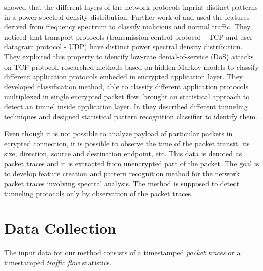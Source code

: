  \cite{he2004spectral} showed that the different layers of the network
protocols inprint distinct patterns in a power spectral density distribution. 
Further work of  and  \cite{chen2007spectral}
used the features derived %
from frequency spectrum to classify malicious and normal traffic.
They noticed that transport protocols (transmission control protocol --
TCP and user datagram protocol - UDP) 
have distinct power spectral density distribution. 
They exploited this property to identify low-rate denial-of-service (DoS)
attacks on TCP protocol. %
 \cite{wright2006inferring} researched methods based on 
hidden Markov models to classify different application protocols embeded in 
encrypted application layer.
They developed classification method, able to classify different 
application protocols multiplexed in single encrypted packet flow.
 brought an statistical approach 
to detect an tunnel inside application layer.
In  \cite{dusi2009tunnel}  they described different tunneling techniques and designed 
statistical pattern recognition classifier to identify them.

Even though it is not possible to analyze payload of particular packets in 
ecrypted connection, it is possible to observe the time of the packet transit, 
its size, direction, source and destination endpoint, etc. 
This data is denoted as packet traces and it is extracted from unencrypted 
part of the packet. 
The goal is to develop feature creation and pattern recognition method for 
the network packet traces involving spectral analysis.
The method is supposed to detect tunneling protocols only by observation 
of the packet traces.

\section{Data Collection}\label{sec:collect}

The input data for our method consists of a timestamped \emph{packet traces} or a
timestamped \emph{traffic flow} statistics. 

